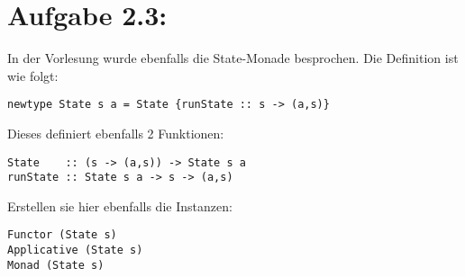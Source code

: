 \documentclass[a4paper,10pt]{scrartcl}
\newcommand{\theuebungszettel}{2}
\begin{document}
\section*{Aufgabe \theuebungszettel.3:}
In der Vorlesung wurde ebenfalls die State-Monade besprochen. Die Definition ist wie folgt:
\begin{verbatim}
newtype State s a = State {runState :: s -> (a,s)}
\end{verbatim}
Dieses definiert ebenfalls 2 Funktionen:
\begin{verbatim}
State    :: (s -> (a,s)) -> State s a
runState :: State s a -> s -> (a,s)
\end{verbatim}
Erstellen sie hier ebenfalls die Instanzen:
\begin{verbatim}
Functor (State s)
Applicative (State s)
Monad (State s)
\end{verbatim}
\end{document}
